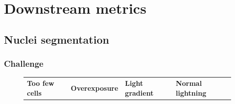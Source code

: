 \section{Downstream metrics}

\subsection{Nuclei segmentation}
\subsubsection{Challenge}
\begin{figure}[H]
    \centering
    \centering
        \begin{tabularx}{\textwidth}{YYYY}
            \textbf{Too few cells} &
            \textbf{Overexposure} &
            \textbf{Light gradient} &
            \textbf{Normal lightning} \\

\end{tabularx}
\end{figure}
